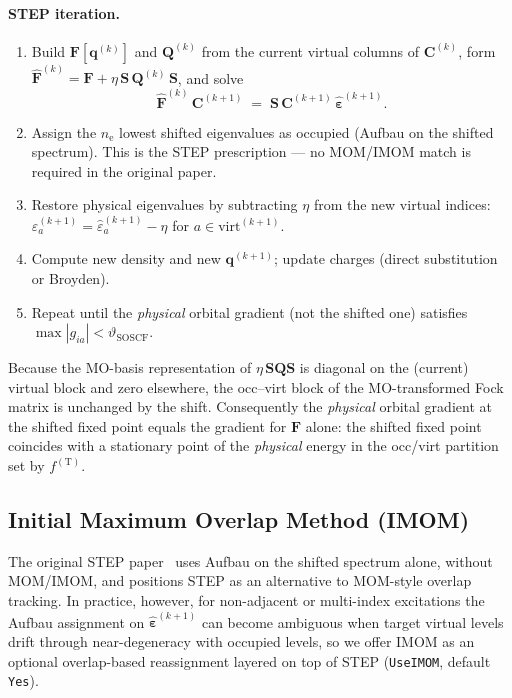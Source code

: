 \documentclass[11pt,a4paper]{article}
\newcommand{\FF}{\mathbf{F}}
\newcommand{\CC}{\mathbf{C}}
\newcommand{\SS}{\mathbf{S}}
\newcommand{\qq}{\mathbf{q}}
\begin{document}
\paragraph{STEP iteration.}
\begin{enumerate}
\item Build $\FF[\qq^{(k)}]$ and $\mathbf{Q}^{(k)}$ from the current
virtual columns of $\CC^{(k)}$, form
$\widehat{\FF}^{(k)}=\FF+\eta\,\SS\,\mathbf{Q}^{(k)}\,\SS$, and solve
\[
\widehat{\FF}^{(k)}\,\CC^{(k+1)} \;=\; \SS\,\CC^{(k+1)}\,\widehat{\bm{\varepsilon}}^{(k+1)}.
\]
\item Assign the $n_\mathrm{e}$ lowest shifted eigenvalues as occupied
(Aufbau on the shifted spectrum). This is the STEP prescription --- no
MOM/IMOM match is required in the original paper.
\item Restore physical eigenvalues by subtracting $\eta$ from the new
virtual indices:
$\varepsilon^{(k+1)}_a = \widehat{\varepsilon}^{(k+1)}_a - \eta$ for
$a\in\mathrm{virt}^{(k+1)}$.
\item Compute new density and new $\qq^{(k+1)}$; update charges
(direct substitution or Broyden).
\item Repeat until the \emph{physical} orbital gradient (not the
shifted one) satisfies $\max|g_{ia}|<\vartheta_\mathrm{SOSCF}$.
\end{enumerate}
Because the MO-basis representation of $\eta\,\SS\mathbf{Q}\SS$ is
diagonal on the (current) virtual block and zero elsewhere, the
occ--virt block of the MO-transformed Fock matrix is unchanged by the
shift. Consequently the \emph{physical} orbital gradient at the
shifted fixed point equals the gradient for $\FF$ alone: the shifted
fixed point coincides with a stationary point of the \emph{physical}
energy in the occ/virt partition set by $f^{(\mathrm{T})}$.

\subsection{Initial Maximum Overlap Method (IMOM)}
\label{sec:imom}

The original STEP paper~\cite{CarterFenkHerbert2020} uses Aufbau on
the shifted spectrum alone, without MOM/IMOM, and positions STEP as
an alternative to MOM-style overlap tracking. In practice, however,
for non-adjacent or multi-index excitations the Aufbau assignment on
$\widehat{\bm{\varepsilon}}^{(k+1)}$ can become ambiguous when target
virtual levels drift through near-degeneracy with occupied levels, so
we offer IMOM as an optional overlap-based reassignment layered on top
of STEP (\texttt{UseIMOM}, default \texttt{Yes}).
\end{document}
